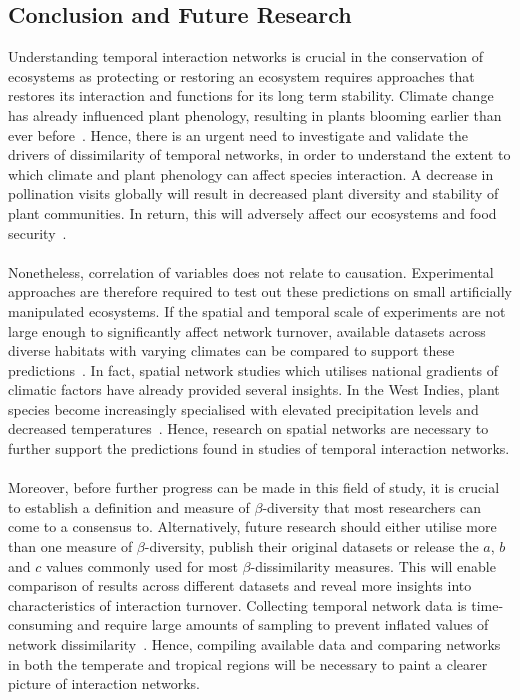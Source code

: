 \documentclass[11pt]{article}
\begin{document}
\subsection{Conclusion and Future Research}
Understanding temporal interaction networks is crucial in the conservation of ecosystems as protecting or restoring an ecosystem requires approaches that restores its interaction and functions for its long term stability. Climate change has already influenced plant phenology, resulting in plants blooming earlier than ever before~\citep{Cleland2007,Miller-Rushing2008}. Hence, there is an urgent need to investigate and validate the drivers of dissimilarity of temporal networks, in order to understand the extent to which climate and plant phenology can affect species interaction. A decrease in pollination visits globally will result in decreased plant diversity and stability of plant communities. In return, this will adversely affect our ecosystems and food security~\citep{Schweiger2010, Burkle2011}. \\
\\
Nonetheless, correlation of variables does not relate to causation. Experimental approaches are therefore required to test out these predictions on small artificially manipulated ecosystems. If the spatial and temporal scale of experiments are not large enough to significantly affect network turnover, available datasets across diverse habitats with varying climates can be compared to support these predictions~\citep{Burkle2009, Burkle2011}. In fact, spatial network studies which utilises national gradients of climatic factors have already provided several insights. In the West Indies, plant species become increasingly specialised with elevated precipitation levels and decreased temperatures~\citep{MartinGonzalez2009}. Hence, research on spatial networks are necessary to further support the predictions found in studies of temporal interaction networks.\\
\\
Moreover, before further progress can be made in this field of study, it is crucial to establish a definition and measure of $\beta$-diversity that most researchers can come to a consensus to. Alternatively, future research should either utilise more than one measure of $\beta$-diversity, publish their original datasets or release the $a$, $b$ and $c$ values commonly used for most $\beta$-dissimilarity measures. This will enable comparison of results across different datasets and reveal more insights into characteristics of interaction turnover. Collecting temporal network data is time-consuming and require large amounts of sampling to prevent inflated values of network dissimilarity~\citep{Koleff2003, Burkle2011, Poisot2015}. Hence, compiling available data and comparing networks in both the temperate and tropical regions will be necessary to paint a clearer picture of interaction networks. \\
\end{document}
